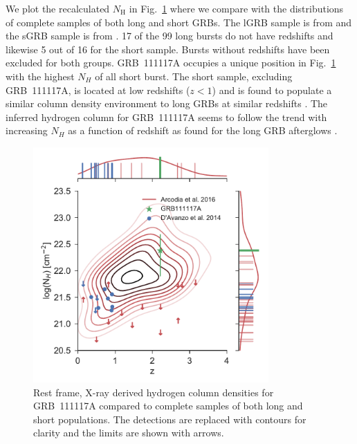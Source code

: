 \documentclass{aa}    %
\begin{document}
We plot the recalculated $N_\mathrm{H}$ in Fig.~\ref{fig:NH_z} where we compare with the
distributions of complete samples of both long and short GRBs. The lGRB sample
is from \citet{Arcodia2016} and the sGRB sample is from \citet{DAvanzo2014a}.
17 of the 99 long bursts do not have redshifts and likewise 5 out of 16 for
the short sample. Bursts without redshifts have been excluded for both groups.
GRB~111117A occupies a unique position in Fig.~\ref{fig:NH_z} with the highest
$N_H$ of all short burst. The short sample, excluding GRB~111117A, is located at
low redshifts ($z < 1$) and is found to populate a similar column density
environment to long GRBs at similar redshifts \citep{DAvanzo2014a}. The inferred
hydrogen column for GRB~111117A seems to follow the trend with increasing $N_H$
as a function of redshift as found for the long GRB afterglows \citep{Arcodia2016}.

\begin{figure}
	\centering
	\includegraphics[width=9cm]{figures/NH_z.pdf}
	\caption{Rest frame, X-ray derived hydrogen column densities for GRB~111117A compared to complete samples of both long and short populations. The detections are replaced with contours for clarity and the limits are shown with arrows.}
	\label{fig:NH_z}
\end{figure}

\end{document}
